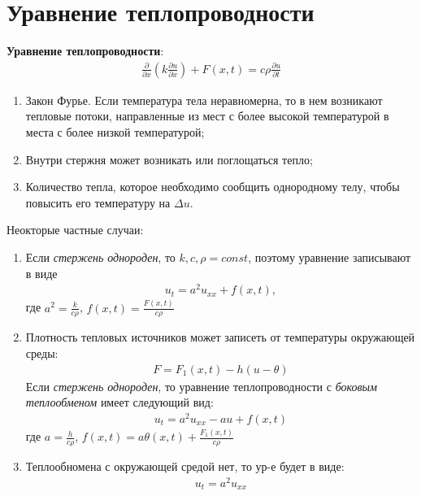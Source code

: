 \documentclass{article}[12pt]
\begin{document}
\section{Уравнение теплопроводности}
\textbf{Уравнение теплопроводности}:
\begin{eqnarray*}
    \frac{\partial}{\partial x}\left(k\frac{\partial u}{\partial x}\right)
    + F(x,t)=c\rho\frac{\partial u}{\partial t}
\end{eqnarray*}
\begin{enumerate}
    \itemsep0em
    \item Закон Фурье. Если температура тела неравномерна, то в нем
        возникают тепловые потоки, направленные из мест с более высокой
        температурой в места с более низкой температурой;
    \item Внутри стержня может возникать или поглощаться тепло;
    \item Количество тепла, которое необходимо сообщить однородному
        телу, чтобы повысить его температуру на $\Delta u$.
\end{enumerate}

Неокторые частные случаи:
\begin{enumerate}
    \itemsep0em
    \item Если \textit{стержень однороден}, то $k,c,\rho = const$, поэтому
        уравнение записывают в виде
        \begin{eqnarray*}
            u_{t}=a^{2}u_{xx}+f(x,t),
        \end{eqnarray*}
        где $a^{2}=\frac{k}{c\rho}$, $f(x,t)=\frac{F(x,t)}{c\rho}$
    \item Плотность тепловых источников может записеть от температуры
        окружающей среды:
        \begin{eqnarray*}
            F=F_{1}(x,t)-h(u-\theta)
        \end{eqnarray*}
        Если \textit{стержень однороден}, то уравнение теплопроводности с \textit{боковым
        теплообменом} имеет следующий вид:
        \begin{eqnarray*}
            u_{t}=a^{2}u_{xx}-au+f(x,t)
        \end{eqnarray*}
        где $a=\frac{h}{c\rho}$,
        $f(x,t)=a\theta(x,t)+\frac{F_{1}(x,t)}{c\rho}$
    \item Теплообномена с окружающей средой нет, то ур-е будет в виде:
        \begin{eqnarray*}
            u_{t}=a^{2}u_{xx}
        \end{eqnarray*}
\end{enumerate}
\end{document}
